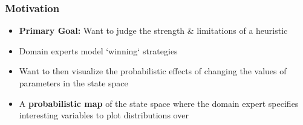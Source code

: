 
\begin{frame} \frametitle{Motivation}
\begin{itemize}
\item {\bf Primary Goal: } Want to judge the strength \& limitations of a heuristic
\item Domain experts model `winning` strategies
\item Want to then visualize the probabilistic effects of changing the
      values of parameters in the state space
\item A {\bf probabilistic map} of the state space where the domain expert
      specifies interesting variables to plot distributions over
\end{itemize}
\end{frame}



